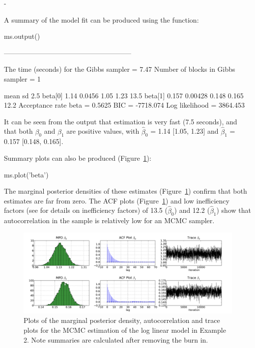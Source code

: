 -\documentclass[article]{jss}
\begin{document}
A summary of the model fit can be produced using the  function:
\begin{CodeChunk}
\begin{CodeInput}
ms.output()
\end{CodeInput}
\begin{CodeOutput}

--------------------------------------------------------

The time (seconds) for the Gibbs sampler =  7.47
Number of blocks in Gibbs sampler =  1

                mean        sd       2.5%
   beta[0]      1.14    0.0456       1.05      1.23       13.5
   beta[1]     0.157   0.00428      0.148     0.165       12.2
Acceptance rate  beta  =  0.5625
BIC =  -7718.074
Log likelihood =  3864.453
\end{CodeOutput}
\end{CodeChunk}

It can be seen from the output that estimation is very fast (7.5
seconds), and that both $\beta_{0}$ and $\beta_{1}$ are positive
values, with $\hat{\beta}_{0}$ = 1.14 {[}1.05, 1.23{]} and
$\hat{\beta}_{1}$ = 0.157 {[}0.148, 0.165{]}. 

Summary plots can also be produced (Figure~\ref{fig:plot_output_eg2}):
\begin{CodeChunk}
\begin{CodeInput}
ms.plot('beta')
\end{CodeInput}
\end{CodeChunk}

The marginal posterior densities of these estimates
(Figure~\ref{fig:plot_output_eg2}) confirm that both estimates are far
from zero. The ACF plots (Figure~\ref{fig:plot_output_eg2}) and low
inefficiency factors (see \citet{ChibGreenberg1996} for details on
inefficiency factors) of 13.5 ($\hat{\beta}_{0}$) and 12.2
($\hat{\beta}_{1}$) show that autocorrelation in the sample is
relatively low for an MCMC sampler. %
\begin{figure}[t!]
  \begin{center}
    \includegraphics[width=16cm]{ex_loglinear.pdf}
  \end{center}
  \caption{Plots of the marginal posterior density, autocorrelation
    and trace plots for the MCMC estimation of the log linear model in
    Example 2. Note summaries are calculated after removing the burn
    in.}
\label{fig:plot_output_eg2}
\end{figure}
\end{document}
